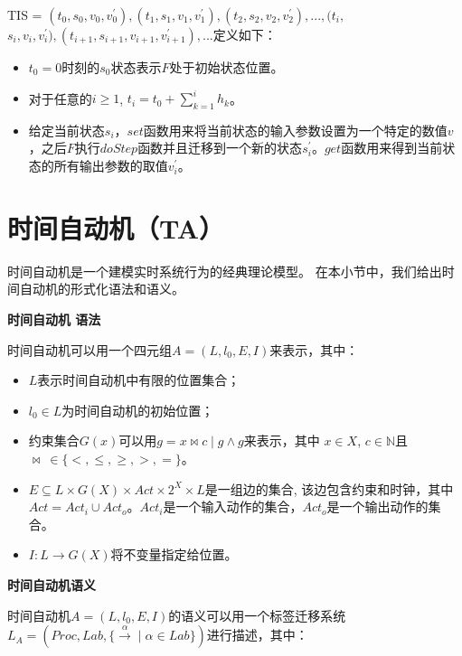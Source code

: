 TIS = $(t_{0},s_{0},v_{0},v_{0}^{\prime}), (t_{1},s_{1},v_{1},v_{1}^{\prime}),(t_{2},s_{2},v_{2},v_{2}^{\prime}), ..., (t_{i},$
$s_{i},v_{i},v_{i}^{\prime}), (t_{i+1},s_{i+1},v_{i+1},v_{i+1}^{\prime}), ...$定义如下：
\begin{itemize}
\item
$t_{0} = 0$时刻的$s_{0}$状态表示$F$处于初始状态位置。
\item
对于任意的$i \geqslant 1$, $t_{i} = t_{0} + \sum_{k = 1}^i h_{k}$。
\item
给定当前状态$s_{i}$，$set$函数用来将当前状态的输入参数设置为一个特定的数值$v$，之后$F$执行$doStep$函数并且迁移到一个新的状态$s_{i}^{\prime}$。$get$函数用来得到当前状态的所有输出参数的取值$v_{i}^{\prime}$。
\end{itemize}
\section{时间自动机（TA）}
时间自动机\cite{BehrmannDLHPYH06}是一个建模实时系统行为的经典理论模型。 在本小节中，我们给出时间自动机的形式化语法和语义。
\begin{define}
\textbf{时间自动机 语法}

时间自动机可以用一个四元组$\textit{A}=(L,l_{0},E,I)$来表示，其中：
\end{define}
\begin{itemize}
\item
$L$表示时间自动机中有限的位置集合；
\item
$l_{0} \in  L$为时间自动机的初始位置；
\item
约束集合$G(x)$可以用$g = x \bowtie c \mid g \land g$来表示，其中 $x \in X$, $c \in \mathbb{N}$且$\bowtie~\in \{<,\leqslant,\geqslant,>,=\}$。
\item
$E \subseteq L \times G(X) \times Act \times 2^X \times L$是一组边的集合, 该边包含约束和时钟，其中 $Act = Act_{i} \cup Act_{o}$。$Act_{i}$是一个输入动作的集合，$Act_{o}$是一个输出动作的集合。
\item
$I : L \rightarrow G(X)$将不变量指定给位置。
\end{itemize}
\begin{define}
\textbf{时间自动机语义} 

时间自动机$\textit{A}=(L,l_{0},E,I)$的语义可以用一个标签迁移系统$L_{\textit{A}} = (Proc,Lab,\lbrace {{\xrightarrow{\alpha}}} \mid \alpha \in Lab \rbrace)$进行描述，其中：
\end{define}
